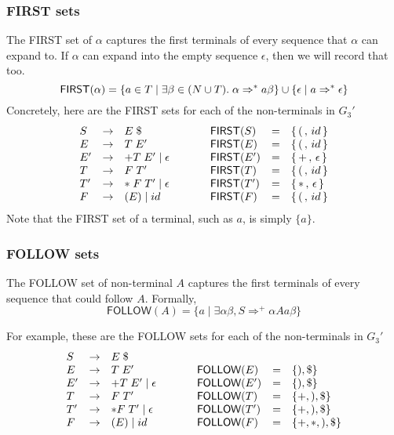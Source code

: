 \subsubsection{FIRST sets}
The \textsf{FIRST} set of $\alpha$ captures the first terminals of every sequence that $\alpha$ can expand to. If $\alpha$ can expand into the empty sequence $\epsilon$, then we will record that too.
\[\textsf{FIRST}(\alpha) = \{a \in T \mid \exists \beta \in (N\cup T)\* . \; \alpha \Rightarrow^{*} a\beta \} \cup \{\epsilon \mid a \Rightarrow^{*} \epsilon \}\]
Concretely, here are the \textsf{FIRST} sets for each of the non-terminals in $G_3'$
\[
\begin{array}{lllp{4ex}lll}
S  & \to & E\;\$                       && \textsf{FIRST}(S)  & = & \{\,(\,,\,id\,\}        \\
E  & \to & T\; E'                      && \textsf{FIRST}(E)  & = & \{\,(\,,\,id\,\}        \\
E' & \to & + T\; E' \mid \epsilon      && \textsf{FIRST}(E') & = & \{\,+\,,\, \epsilon\,\} \\
T  & \to & F \;T'                      && \textsf{FIRST}(T)  & = & \{\,(\,,\, id\,\}       \\
T' & \to & *\;F\; T' \mid \epsilon     && \textsf{FIRST}(T') & = & \{\,*\,,\, \epsilon\,\} \\
F  & \to & (E) \mid id                 && \textsf{FIRST}(F)  & = & \{\,(\,,\, id\,\}       \\
\end{array}
\]
Note that the \textsf{FIRST} set of a terminal, such as $a$, is simply $\{a\}$.

\subsubsection{FOLLOW sets}
The \textsf{FOLLOW} set of non-terminal $A$ captures the first terminals of every sequence that could follow $A$. Formally, 
\[
\textsf{FOLLOW}(A) = \{ a \mid \exists \alpha \beta, S \Rightarrow^+ \alpha A a \beta \}
\]

For example, these are the \textsf{FOLLOW} sets for each of the non-terminals in $G_3'$
\[
\begin{array}{lllp{4ex}lll}
S  & \to & E\;\$                                                         \\
E  & \to & T\;E'                 &  & \textsf{FOLLOW}(E)  & = & \{),\$\}   \\
E' & \to & + T\;E' \mid \epsilon &  & \textsf{FOLLOW}(E') & = & \{),\$\}   \\
T  & \to & F\;T'                  &  & \textsf{FOLLOW}(T)  & = & \{+,),\$\} \\
T' & \to & * F\;T' \mid \epsilon &  & \textsf{FOLLOW}(T') & = & \{+,),\$\} \\
F  & \to & (E) \mid id          &  & \textsf{FOLLOW}(F)  & = & \{+,*,),\$\} 
\end{array}
\]

